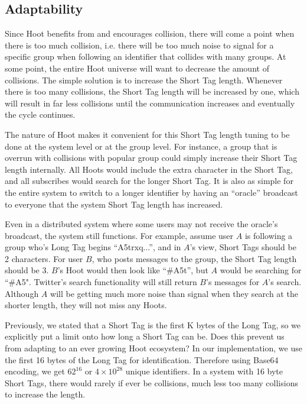 
\subsection{Adaptability}

Since Hoot benefits from and encourages collision, there will come a point when there is too much collision, i.e. there will be too much noise to signal for a specific group when following an identifier that collides with many groups. At some point, the entire Hoot universe will want to decrease the amount of collisions. The simple solution is to increase the Short Tag length. Whenever there is too many collisions, the Short Tag length will be increased by one, which will result in far less collisions until the communication increases and eventually the cycle continues. 

The nature of Hoot makes it convenient for this Short Tag length tuning to be done at the system level or at the group level. For instance, a group that is overrun with collisions with popular group could simply increase their Short Tag length internally. All Hoots would include the extra character in the Short Tag, and all subscribes would search for the longer Short Tag. It is also as simple for the entire system to switch to a longer identifier by having an ``oracle'' broadcast to everyone that the system Short Tag length has increased.

Even in a distributed system where some users may not receive the oracle's broadcast, the system still functions. For example, assume user $A$ is following a group who's Long Tag begins ``A5trxq...'', and in $A$'s view, Short Tags should be 2 characters. For user $B$, who posts messages to the group, the Short Tag length should be 3. $B$'s Hoot would then look like ``\#A5t'', but $A$ would be searching for ``\#A5". Twitter's search functionality will still return $B$'s messages for $A$'s search. Although $A$ will be getting much more noise than signal when they search at the shorter length, they will not miss any Hoots.

Previously, we stated that a Short Tag is the first K bytes of the Long Tag, so we explicitly put a limit onto how long a Short Tag can be. Does this prevent us from adapting to an ever growing Hoot ecosystem? In our implementation, we use the first 16 bytes of the Long Tag for identification. Therefore using Base64 encoding, we get $62^{16}$ or $4\times10^{28}$ unique identifiers. In a system with 16 byte Short Tags, there would rarely if ever be collisions, much less too many collisions to increase the length.

